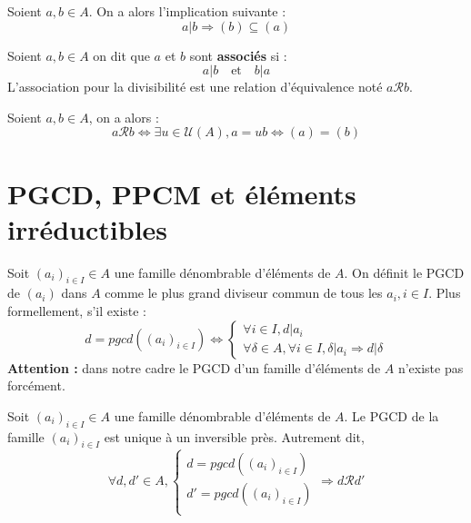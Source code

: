 \begin{prop}
    Soient $a,b \in A$. On a alors l'implication suivante : 
        \[ a | b \Longrightarrow (b) \subseteq (a) \] 
\end{prop}

\begin{definition}
    Soient $a,b \in A$ on dit que $a$ et $b$ sont \textbf{associés} si : 
        \[ a | b \quad \text{et} \quad b | a \] 
    L'association pour la divisibilité est une relation d'équivalence noté $a \mathcal{R} b$. 
\end{definition}

\begin{proposition}
    Soient $a,b \in A$, on a alors : 
        \[ a \mathcal{R} b \iff \exists u \in \mathcal{U}(A), a = ub \iff (a) = (b) \] 
\end{proposition}



\section{PGCD, PPCM et éléments irréductibles}

\begin{definition}[PGCD]
    Soit $(a_i)_{i \in I} \in A$ une famille dénombrable d'éléments de $A$. 
    On définit le PGCD de $(a_i)$ dans $A$ comme le plus grand diviseur commun de tous les $a_i, i \in I$. 
    Plus formellement, s'il existe : 
        \[ \boxed{ d = pgcd((a_i)_{i \in I}) \iff 
        \begin{cases}
            \forall i \in I, d | a_i \\ 
            \forall \delta \in A, \forall i \in I, \delta | a_i \Longrightarrow d | \delta 
        \end{cases} } \] 
    \textbf{Attention :} dans notre cadre le PGCD d'un famille d'éléments de $A$ n'existe pas forcément. 
\end{definition}

\begin{proposition}
    Soit $(a_i)_{i \in I} \in A$ une famille dénombrable d'éléments de $A$. 
    Le PGCD de la famille $(a_i)_{i \in I}$ est unique à un inversible près. 
    Autrement dit,
        \[ \forall d,d' \in A, 
        \begin{cases}
            d = pgcd((a_i)_{i \in I}) \\ 
            d' = pgcd((a_i)_{i \in I}) \\ 
        \end{cases}
        \Longrightarrow d \mathcal{R} d' \] 
\end{proposition}

